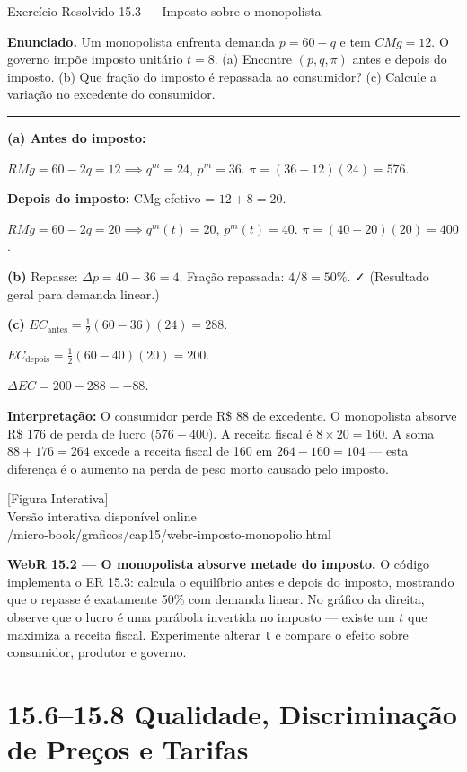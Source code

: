 \documentclass[11pt,twoside,openright]{book}
\newcommand{\figurePlaceholder}[1]{%
  \begin{center}
    \begin{tcolorbox}[
      width=0.85\textwidth,
      colback=graybg,
      colframe=gray,
      boxrule=0.5pt,
      arc=2pt,
      halign=center,
      valign=center,
      height=5cm
    ]
      \centering
      \vfill
      {\sffamily\color{gray}\large [Figura Interativa]}\\[6pt]
      {\sffamily\small\color{gray} Versão interativa disponível online}\\[4pt]
      {\ttfamily\tiny\color{gray} #1}
      \vfill
    \end{tcolorbox}
  \end{center}
}
\begin{document}
\begin{exresolvidobox}{Exercício Resolvido 15.3 — Imposto sobre o monopolista}

\textbf{Enunciado.} Um monopolista enfrenta demanda \(p = 60 - q\) e tem
\(CMg = 12\). O governo impõe imposto unitário \(t = 8\). (a) Encontre
\((p, q, \pi)\) antes e depois do imposto. (b) Que fração do imposto é
repassada ao consumidor? (c) Calcule a variação no excedente do
consumidor.

\begin{center}\rule{0.5\linewidth}{0.5pt}\end{center}

\textbf{(a) Antes do imposto:}

\(RMg = 60 - 2q = 12 \implies q^m = 24\), \(p^m = 36\).
\(\pi = (36-12)(24) = 576\).

\textbf{Depois do imposto:} CMg efetivo = \(12 + 8 = 20\).

\(RMg = 60 - 2q = 20 \implies q^m(t) = 20\), \(p^m(t) = 40\).
\(\pi = (40 - 20)(20) = 400\).

\textbf{(b)} Repasse: \(\Delta p = 40 - 36 = 4\). Fração repassada:
\(4/8 = 50\%\). ✓ (Resultado geral para demanda linear.)

\textbf{(c)} \(EC_{\text{antes}} = \frac{1}{2}(60-36)(24) = 288\).

\(EC_{\text{depois}} = \frac{1}{2}(60-40)(20) = 200\).

\(\Delta EC = 200 - 288 = -88\).

\textbf{Interpretação:} O consumidor perde R\$ 88 de excedente. O
monopolista absorve R\$ 176 de perda de lucro (\(576 - 400\)). A receita
fiscal é \(8 \times 20 = 160\). A soma \(88 + 176 = 264\) excede a
receita fiscal de 160 em \(264 - 160 = 104\) --- esta diferença é o
aumento na perda de peso morto causado pelo imposto.

\end{exresolvidobox}

\figurePlaceholder{/micro-book/graficos/cap15/webr-imposto-monopolio.html}

\textbf{WebR 15.2 --- O monopolista absorve metade do imposto.} O código
implementa o ER 15.3: calcula o equilíbrio antes e depois do imposto,
mostrando que o repasse é exatamente 50\% com demanda linear. No gráfico
da direita, observe que o lucro é uma parábola invertida no imposto ---
existe um \(t\) que maximiza a receita fiscal. Experimente alterar
\texttt{t} e compare o efeito sobre consumidor, produtor e governo.

\chapter{15.6--15.8 Qualidade, Discriminação de Preços e
Tarifas}\label{qualidade-discriminauxe7uxe3o-de-preuxe7os-e-tarifas}
\end{document}
